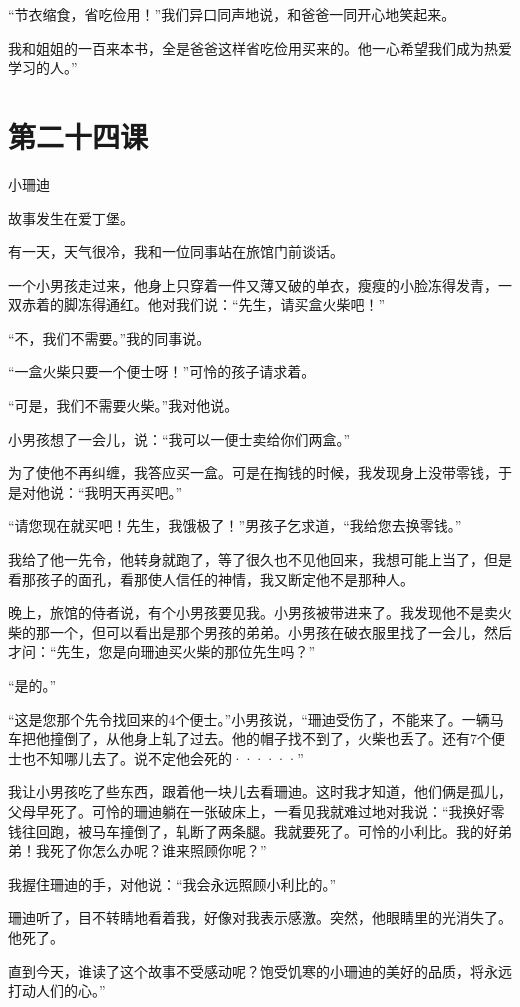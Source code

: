 \documentclass[12pt,UTF8]{ctexbook}
\begin{document}
“节衣缩食，省吃俭用！”我们异口同声地说，和爸爸一同开心地笑起来。

我和姐姐的一百来本书，全是爸爸这样省吃俭用买来的。他一心希望我们成为热爱学习的人。”

\section{第二十四课}

小珊迪

故事发生在爱丁堡。

有一天，天气很冷，我和一位同事站在旅馆门前谈话。

一个小男孩走过来，他身上只穿着一件又薄又破的单衣，瘦瘦的小脸冻得发青，一双赤着的脚冻得通红。他对我们说：“先生，请买盒火柴吧！”

“不，我们不需要。”我的同事说。

“一盒火柴只要一个便士呀！”可怜的孩子请求着。

“可是，我们不需要火柴。”我对他说。

小男孩想了一会儿，说：“我可以一便士卖给你们两盒。”

为了使他不再纠缠，我答应买一盒。可是在掏钱的时候，我发现身上没带零钱，于是对他说：“我明天再买吧。”

“请您现在就买吧！先生，我饿极了！”男孩子乞求道，“我给您去换零钱。”

我给了他一先令，他转身就跑了，等了很久也不见他回来，我想可能上当了，但是看那孩子的面孔，看那使人信任的神情，我又断定他不是那种人。

晚上，旅馆的侍者说，有个小男孩要见我。小男孩被带进来了。我发现他不是卖火柴的那一个，但可以看出是那个男孩的弟弟。小男孩在破衣服里找了一会儿，然后才问：“先生，您是向珊迪买火柴的那位先生吗？”

“是的。”

“这是您那个先令找回来的4个便士。”小男孩说，“珊迪受伤了，不能来了。一辆马车把他撞倒了，从他身上轧了过去。他的帽子找不到了，火柴也丢了。还有7个便士也不知哪儿去了。说不定他会死的······”

我让小男孩吃了些东西，跟着他一块儿去看珊迪。这时我才知道，他们俩是孤儿，父母早死了。可怜的珊迪躺在一张破床上，一看见我就难过地对我说：“我换好零钱往回跑，被马车撞倒了，轧断了两条腿。我就要死了。可怜的小利比。我的好弟弟！我死了你怎么办呢？谁来照顾你呢？”

我握住珊迪的手，对他说：“我会永远照顾小利比的。”

珊迪听了，目不转睛地看着我，好像对我表示感激。突然，他眼睛里的光消失了。他死了。

直到今天，谁读了这个故事不受感动呢？饱受饥寒的小珊迪的美好的品质，将永远打动人们的心。”
\end{document}
